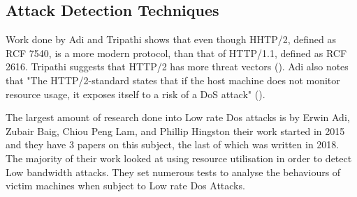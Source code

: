 \subsection{Attack Detection Techniques}
Work done by Adi and Tripathi shows that even though HHTP/2, defined as RCF 7540, is a more  modern protocol, than that of HTTP/1.1, defined as  RCF 2616. Tripathi suggests that HTTP/2 has more threat vectors (\cite{tripathi2018slow}). Adi also notes that "The HTTP/2-standard states that if the host machine does not monitor resource usage, it exposes itself to a risk of a DoS attack" (\cite{Adi2015}).

The largest amount of research done into Low rate Dos attacks is by Erwin Adi, Zubair Baig, Chiou Peng Lam, and Phillip Hingston their work started in 2015 and they have 3 papers on this subject, the last of which was written in 2018. The majority of their work looked at using resource utilisation in order to detect Low bandwidth attacks. They set numerous tests to analyse the behaviours of victim machines when subject to Low rate Dos Attacks. 

